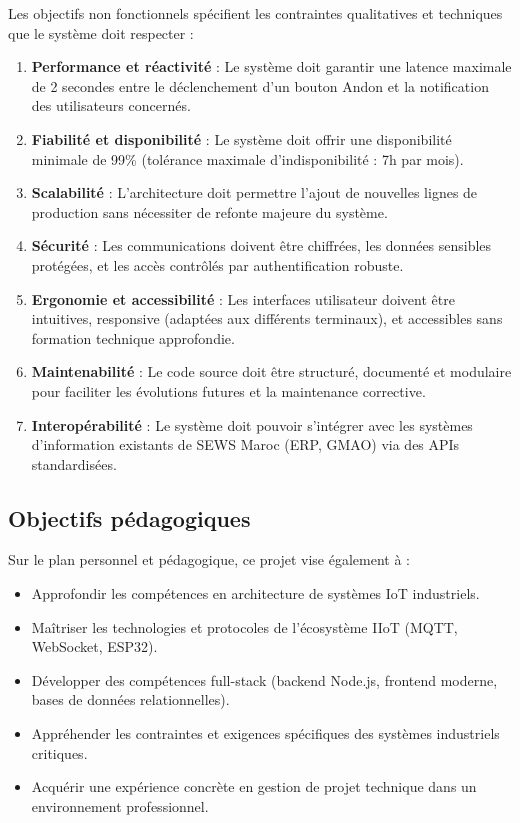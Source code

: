 Les objectifs non fonctionnels spécifient les contraintes qualitatives et techniques que le système doit respecter :

\begin{enumerate}
    \item \textbf{Performance et réactivité} : Le système doit garantir une latence maximale de 2 secondes entre le déclenchement d'un bouton Andon et la notification des utilisateurs concernés.
    
    \item \textbf{Fiabilité et disponibilité} : Le système doit offrir une disponibilité minimale de 99\% (tolérance maximale d'indisponibilité : 7h par mois).
    
    \item \textbf{Scalabilité} : L'architecture doit permettre l'ajout de nouvelles lignes de production sans nécessiter de refonte majeure du système.
    
    \item \textbf{Sécurité} : Les communications doivent être chiffrées, les données sensibles protégées, et les accès contrôlés par authentification robuste.
    
    \item \textbf{Ergonomie et accessibilité} : Les interfaces utilisateur doivent être intuitives, responsive (adaptées aux différents terminaux), et accessibles sans formation technique approfondie.
    
    \item \textbf{Maintenabilité} : Le code source doit être structuré, documenté et modulaire pour faciliter les évolutions futures et la maintenance corrective.
    
    \item \textbf{Interopérabilité} : Le système doit pouvoir s'intégrer avec les systèmes d'information existants de SEWS Maroc (ERP, GMAO) via des APIs standardisées.
\end{enumerate}

\subsection{Objectifs pédagogiques}

Sur le plan personnel et pédagogique, ce projet vise également à :

\begin{itemize}
    \item Approfondir les compétences en architecture de systèmes IoT industriels.
    \item Maîtriser les technologies et protocoles de l'écosystème IIoT (MQTT, WebSocket, ESP32).
    \item Développer des compétences full-stack (backend Node.js, frontend moderne, bases de données relationnelles).
    \item Appréhender les contraintes et exigences spécifiques des systèmes industriels critiques.
    \item Acquérir une expérience concrète en gestion de projet technique dans un environnement professionnel.
\end{itemize}



